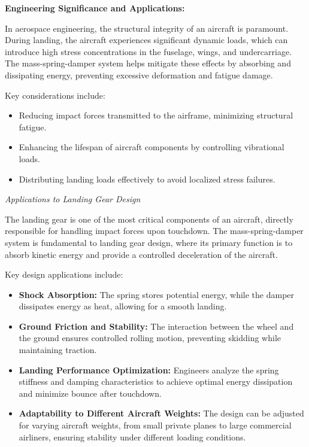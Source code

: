 \documentclass[12pt,letterpaper, onecolumn]{exam}
\begin{document}
\begin{questions}
\begin{solution}
\begin{parts}
                \vspace{5mm}

                \textbf{Engineering Significance and Applications:}

                \vspace{5mm}

                In aerospace engineering, the structural integrity of an aircraft is paramount. During landing, the aircraft experiences significant dynamic loads, which can introduce high stress concentrations in the fuselage, wings, and undercarriage. The mass-spring-damper system helps mitigate these effects by absorbing and dissipating energy, preventing excessive deformation and fatigue damage. 

Key considerations include:
\begin{itemize}
    \item Reducing impact forces transmitted to the airframe, minimizing structural fatigue.
    \item Enhancing the lifespan of aircraft components by controlling vibrational loads.
    \item Distributing landing loads effectively to avoid localized stress failures.
\end{itemize}

\textit{Applications to Landing Gear Design}

The landing gear is one of the most critical components of an aircraft, directly responsible for handling impact forces upon touchdown. The mass-spring-damper system is fundamental to landing gear design, where its primary function is to absorb kinetic energy and provide a controlled deceleration of the aircraft.

Key design applications include:
\begin{itemize}
    \item \textbf{Shock Absorption:} The spring stores potential energy, while the damper dissipates energy as heat, allowing for a smooth landing.
    \item \textbf{Ground Friction and Stability:} The interaction between the wheel and the ground ensures controlled rolling motion, preventing skidding while maintaining traction.
    \item \textbf{Landing Performance Optimization:} Engineers analyze the spring stiffness and damping characteristics to achieve optimal energy dissipation and minimize bounce after touchdown.
    \item \textbf{Adaptability to Different Aircraft Weights:} The design can be adjusted for varying aircraft weights, from small private planes to large commercial airliners, ensuring stability under different loading conditions.
\end{itemize}


\end{parts}
\end{solution}
\end{questions}
\end{document}
